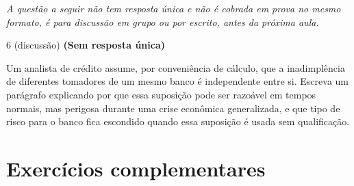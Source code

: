 \documentclass[11pt]{article}
\begin{document}
\bigskip
\noindent\textit{A questão a seguir não tem resposta única e não é cobrada em prova no mesmo
formato, é para discussão em grupo ou por escrito, antes da próxima aula.}

\begin{questao}{6 (discussão)} \textbf{(Sem resposta única)}

Um analista de crédito assume, por conveniência de cálculo, que a inadimplência de diferentes
tomadores de um mesmo banco é independente entre si. Escreva um parágrafo explicando por que essa
suposição pode ser razoável em tempos normais, mas perigosa durante uma crise econômica
generalizada, e que tipo de risco para o banco fica escondido quando essa suposição é usada sem
qualificação.
\end{questao}


\bigskip
\section*{Exercícios complementares}
\end{document}
